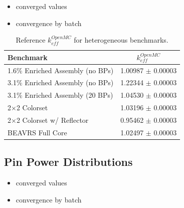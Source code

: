 \begin{itemize}[noitemsep]
  \item converged values
  \item convergence by batch
\end{itemize}

\begin{table}[h!]
  \centering
  \caption[Reference $k^{OpenMC}_{eff}$ for heterogeneous benchmarks]{Reference $k^{OpenMC}_{eff}$ for heterogeneous benchmarks.}
  \small
  \label{table:chap7-ref-eigenvalues}
  \vspace{6pt}
  \begin{tabular}{l c}
  \toprule
  \textbf{Benchmark} & \textbf{$k^{OpenMC}_{eff}$} \\
  \midrule
  1.6\% Enriched Assembly (no \ac{BP}s) & 1.00987 $\pm$ 0.00003 \\
  3.1\% Enriched Assembly (no \ac{BP}s) & 1.22344 $\pm$ 0.00003 \\
  3.1\% Enriched Assembly (20 \ac{BP}s) & 1.04530 $\pm$ 0.00003 \\
  2$\times$2 Colorset & 1.03196 $\pm$ 0.00003 \\
  2$\times$2 Colorset w/ Reflector & 0.95462 $\pm$ 0.00003 \\
  \ac{BEAVRS} Full Core & 1.02497 $\pm$ 0.00003 \\
  \bottomrule
\end{tabular}
\end{table}

\subsection{Pin Power Distributions}
\label{subsec:chap7-pin-powers}

\begin{itemize}[noitemsep]
  \item converged values
  \item convergence by batch
\end{itemize}

